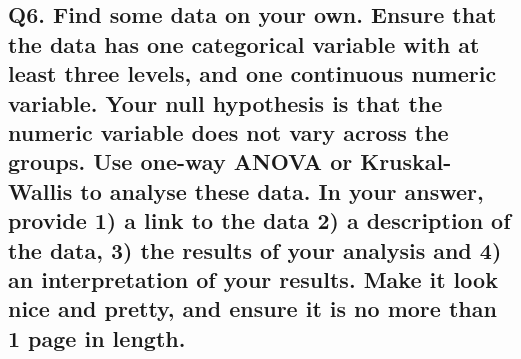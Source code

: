 \documentclass[
]{article}
\newenvironment{Shaded}{\begin{snugshade}}{\end{snugshade}}
\newcommand{\CommentTok}[1]{\textcolor[rgb]{0.56,0.35,0.01}{\textit{#1}}}
\newcommand{\FunctionTok}[1]{\textcolor[rgb]{0.13,0.29,0.53}{\textbf{#1}}}
\newcommand{\NormalTok}[1]{#1}
\newcommand{\SpecialCharTok}[1]{\textcolor[rgb]{0.81,0.36,0.00}{\textbf{#1}}}
\begin{document}
\begin{Shaded}
\end{Shaded}

\subsection{Q6. Find some data on your own. Ensure that the data has one
categorical variable with at least three levels, and one continuous
numeric variable. Your null hypothesis is that the numeric variable does
not vary across the groups. Use one-way ANOVA or Kruskal-Wallis to
analyse these data. In your answer, provide 1) a link to the data 2) a
description of the data, 3) the results of your analysis and 4) an
interpretation of your results. Make it look nice and pretty, and ensure
it is no more than 1 page in
length.}\label{q6.-find-some-data-on-your-own.-ensure-that-the-data-has-one-categorical-variable-with-at-least-three-levels-and-one-continuous-numeric-variable.-your-null-hypothesis-is-that-the-numeric-variable-does-not-vary-across-the-groups.-use-one-way-anova-or-kruskal-wallis-to-analyse-these-data.-in-your-answer-provide-1-a-link-to-the-data-2-a-description-of-the-data-3-the-results-of-your-analysis-and-4-an-interpretation-of-your-results.-make-it-look-nice-and-pretty-and-ensure-it-is-no-more-than-1-page-in-length.}
\end{document}
